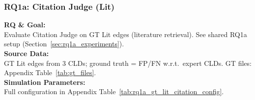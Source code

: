 \subsubsection{RQ1a: Citation Judge (Lit)}
\label{sec:rq1a_citation_lit}

\textbf{RQ \& Goal:}\\
Evaluate Citation Judge on GT Lit edges (literature retrieval). See shared RQ1a setup (Section~\ref{sec:rq1a_experiments}).\\
\textbf{Source Data:}\\
GT Lit edges from 3 CLDs; ground truth = FP/FN w.r.t.\ expert CLDs. GT files: Appendix Table~\ref{tab:gt_files}.\\
\textbf{Simulation Parameters:}\\
Full configuration in Appendix Table~\ref{tab:rq1a_gt_lit_citation_config}.\\

